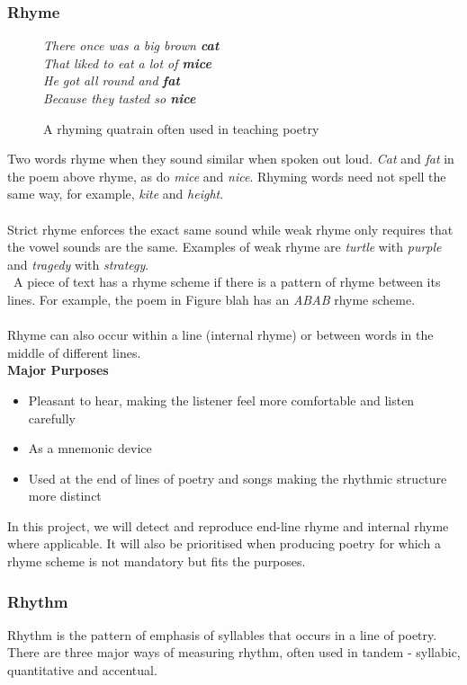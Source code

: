 \subsubsection{Rhyme}
\begin{figure}[h!]
\centering
\textit{
There once was a big brown \textbf{cat}\\
That liked to eat a lot of \textbf{mice}\\
He got all round and \textbf{fat}\\
Because they tasted so \textbf{nice}
}
\caption{A rhyming quatrain often used in teaching poetry}
\end{figure}
Two words rhyme when they sound similar when spoken out loud. \textit{Cat} and \textit{fat} in the poem above rhyme, as do \textit{mice} and \textit{nice}. Rhyming words need not spell the same way, for example, \textit{kite} and \textit{height}. 
\\\\
Strict rhyme enforces the exact same sound while weak rhyme only requires that the vowel sounds are the same. Examples of weak rhyme are \textit{turtle} with \textit{purple} and \textit{tragedy} with \textit{strategy}. 
\\\
A piece of text has a rhyme scheme if there is a pattern of rhyme between its lines. For example, the poem in Figure blah has an \textit{ABAB} rhyme scheme.
\\\\
Rhyme can also occur within a line (internal rhyme) or between words in the middle of different lines.\\

\textbf{Major Purposes} 
\begin{itemize}
\item{Pleasant to hear, making the listener feel more comfortable and listen carefully} 
\item{As a mnemonic device}
\item{Used at the end of lines of poetry and songs making the rhythmic structure more distinct}
\end{itemize}

In this project, we will detect and reproduce end-line rhyme and internal rhyme where applicable. It will also be prioritised when producing poetry for which a rhyme scheme is not mandatory but fits the purposes.

\subsubsection{Rhythm}
Rhythm is the pattern of emphasis of syllables that occurs in a line of poetry. There are three major ways of measuring rhythm, often used in tandem - syllabic, quantitative and accentual.

